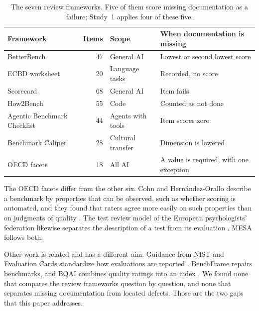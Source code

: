\documentclass[runningheads]{llncs}
\begin{document}
\begin{table}[t]
\caption{The seven review frameworks. Five of them score missing documentation as a failure; Study~1 applies four of these five.}
\label{tab:frameworks}
\centering
\footnotesize
\begin{tabularx}{\textwidth}{@{}>{\raggedright\arraybackslash}p{3.3cm}r>{\raggedright\arraybackslash}p{2.3cm}>{\raggedright\arraybackslash}X@{}}
\toprule
\textbf{Framework} & \textbf{Items} & \textbf{Scope} & \textbf{When documentation is missing} \\
\midrule
BetterBench \cite{reuel_betterbench} & 47 & General AI & Lowest or second lowest score \\
ECBD worksheet \cite{liu_ecbd_2024} & 20 & Language tasks & Recorded, no score \\
Scorecard \cite{san_joaquin_scorecard_2026} & 68 & General AI & Item fails \\
How2Bench \cite{cao_how2bench_2025} & 55 & Code & Counted as not done \\
Agentic Benchmark Checklist \cite{zhu_agentic_benchmark_checklist_2025} & 44 & Agents with tools & Item scores zero \\
Benchmark Caliper \cite{corona_benchmark_caliper_2026} & 28 & Cultural transfer & Dimension is lowered \\
OECD facets \cite{cohn_hernandez_orallo_oecd_2023} & 18 & All AI & A value is required, with one exception \\
\bottomrule
\end{tabularx}
\end{table}

The OECD facets differ from the other six. Cohn and Hern\'andez-Orallo describe a benchmark by properties that can be observed, such as whether scoring is automated, and they found that raters agree more easily on such properties than on judgments of quality \cite{cohn_categorising_2022,cohn_hernandez_orallo_oecd_2023}. The test review model of the European psychologists' federation likewise separates the description of a test from its evaluation \cite{efpa_test_review_model_2025}. MESA follows both.

Other work is related and has a different aim. Guidance from NIST and Evaluation Cards standardize how evaluations are reported \cite{nist_ai_800_2_2026,ghosh_evaluation_cards_2026}. BenchFrame repairs benchmarks, and BQAI combines quality ratings into an index \cite{koohestani_benchframe_2025,gomez_bqai_2026}. We found none that compares the review frameworks question by question, and none that separates missing documentation from located defects. Those are the two gaps that this paper addresses.
\end{document}
